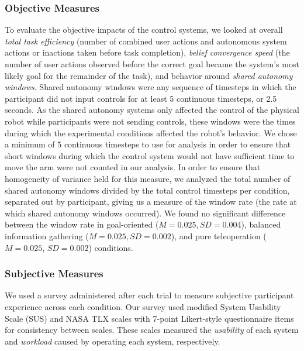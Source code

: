 \documentclass[conference]{IEEEtran}
\begin{document}
\subsubsection{Objective Measures}
To evaluate the objective impacts of the control systems, we looked at overall \textit{total task efficiency} (number of combined user actions and autonomous system actions or inactions taken before task completion), \textit{belief convergence speed} (the number of user actions observed before the correct goal became the system's most likely goal for the remainder of the task), and behavior around \textit{shared autonomy windows}. Shared autonomy windows were any sequence of timesteps in which the participant did not input controls for at least 5 continuous timesteps, or 2.5 seconds. As the shared autonomy systems only affected the control of the physical robot while participants were not sending controls, these windows were the times during which the experimental conditions affected the robot's behavior. We chose a minimum of 5 continuous timesteps to use for analysis in order to ensure that short windows during which the control system would not have sufficient time to move the arm were not counted in our analysis. In order to ensure that homogeneity of variance held for this measure, we analyzed the total number of shared autonomy windows divided by the total control timesteps per condition, separated out by participant, giving us a measure of the window rate (the rate at which shared autonomy windows occurred). We found no significant difference between the window rate in goal-oriented ($M = 0.025, SD = 0.004$), balanced information gathering ($M = 0.025, SD = 0.002$), and pure teleoperation ($M = 0.025$, $SD = 0.002$) conditions.

\subsubsection{Subjective Measures}

We used a survey administered after each trial to measure subjective participant experience across each condition. Our survey used modified System Usability Scale (SUS) and NASA TLX scales with 7-point Likert-style questionnaire items for consistency between scales. These scales measured the \textit{usability} of each system and \textit{workload} caused by operating each system, respectively.

%
%
\end{document}
